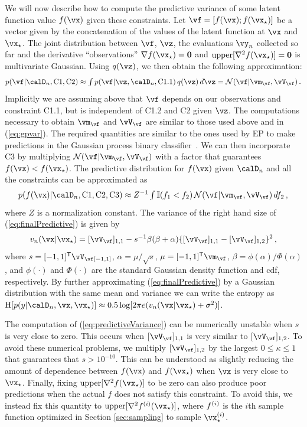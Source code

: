 We will now describe how to compute the predictive variance of some latent
function value $f(\x)$ given these constraints. Let $\vf=[f(\vx); f(\xopt)]$ be a
vector given by the concatenation of the values of the latent function at $\x$ and $\xopt$.
The joint distribution between $\vf$,  $\vz$, the evaluations $\vy_n$ collected so far and
the derivative ``observations'' $\nabla f(\xopt)=\zero$ and
$\upper[\nabla^2 f(\xopt)]=\zero$ is multivariate Gaussian.
Using $q(\vz)$, we then obtain the following approximation:
\begin{equation}
    \textstyle
    p(\vf|\D_n,\C1,\C2) \approx
    \int p(\vf|\vz,\D_n,\C{1.1}) \,q(\vz)\,d \vz =
    \Normal(\vf|\vm_\vf,\vV_\vf)\,.
\end{equation}
Implicitly we are assuming above that $\vf$ depends on our observations and
constraint C1.1, but is independent of C1.2 and C2 given $\vz$.  The
computations necessary to obtain $\vm_\vf$ and $\vV_\vf$ are similar to those used
above and in (\ref{eq:gpvar}).
The required quantities are similar to the ones used by EP to make predictions in the
Gaussian process binary classifier~\cite{Rasmussen:2006}.  We can then
incorporate C3 by multiplying $\Normal(\vf|\vm_\vf,\vV_\vf)$ with a factor that
guarantees $f(\x) < f(\xopt)$.  The predictive distribution for $f(\x)$ given
$\D_n$ and all the constraints can be approximated as
\begin{align}
    \textstyle
    p(f(\x)|\D_n,\C1,\C2,\C3) 
    \approx
    Z^{-1} \int \I( f_1 < f_2) \,\Normal(\vf|\vm_\vf,\vV_\vf) \,df_2\,,
    \label{eq:finalPredictive}
\end{align}
where $Z$ is a normalization constant.  The variance of the right hand size of
(\ref{eq:finalPredictive}) is given by
\begin{equation}
    v_n(\x|\xopt)
    = [\vV_\vf]_{1,1} -
    s^{-1}\beta(\beta + \alpha)
    \{  [\vV_\vf]_{1,1} - [\vV_\vf]_{1,2} \}^2\,,
\label{eq:predictiveVariance}
\end{equation}
where $s = [-1, 1]\T \vV_\vf [-1, 1]$, $\alpha = \mu / \sqrt{s}$, $\mu = [-1, 1]\T
\vm_\vf$, $\beta = \phi(\alpha) / \Phi(\alpha)$, and $\phi(\cdot)$ and $\Phi(\cdot)$
are the standard Gaussian density function and cdf, respectively.  By further
approximating (\ref{eq:finalPredictive}) by a Gaussian distribution with the
same mean and variance we can write the entropy as
$\H[p(y|\D_n,\x,\xopt)] \approx 0.5 \log [2 \pi e (v_n(\x|\xopt) +
\sigma^2)  ]$.

The computation of (\ref{eq:predictiveVariance}) can be numerically unstable
when $s$ is very close to zero.  This occurs when $[\vV_\vf]_{1,1}$ is very similar
to $[\vV_\vf]_{1,2}$.  To avoid these numerical problems, we multiply $[\vV_\vf]_{1,2}$
by the largest $0\leq \kappa \leq 1$ that guarantees that $s > 10^{-10}$. This
can be understood as slightly reducing the amount of dependence between $f(\x)$
and $f(\xopt)$ when $\x$ is very close to $\xopt$.  Finally, fixing
$\upper[\nabla^2 f(\xopt)]$ to be zero can also produce poor predictions when
the actual $f$ does not satisfy this constraint.  To avoid this, we instead fix this quantity to
$\upper[\nabla^2 f\i(\xopt)]$, where $f^{(i)}$ is the $i$th
sample function optimized in Section \ref{sec:sampling} to sample $\xopt\i$.

